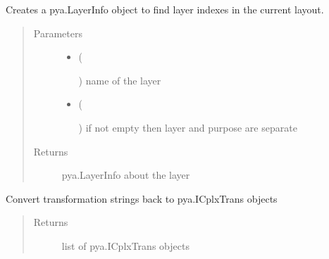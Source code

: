 \documentclass[a4paper,10pt,english]{sphinxmanual}
\begin{document}
\begin{fulllineitems}
\begin{fulllineitems}
Creates a pya.LayerInfo object to find layer indexes in the current layout.
\begin{quote}\begin{description}
\item[{Parameters}] \leavevmode\begin{itemize}
\item {} 
 (%
\begin{footnote}[56]\sphinxAtStartFootnote
{}
%
\end{footnote}) \textendash{} name of the layer

\item {} 
 (%
\begin{footnote}[57]\sphinxAtStartFootnote
{}
%
\end{footnote}) \textendash{} if not empty then layer and purpose are separate

\end{itemize}

\item[{Returns}] \leavevmode
pya.LayerInfo about the layer

\end{description}\end{quote}

\end{fulllineitems}


\begin{fulllineitems}
\label{\detokenize{photonics:photonics.PhotDevice.get_transformations}}
Convert transformation strings back to pya.ICplxTrans objects
\begin{quote}\begin{description}
\item[{Returns}] \leavevmode
list of pya.ICplxTrans objects

\end{description}\end{quote}


\end{fulllineitems}
\end{fulllineitems}
\end{document}
